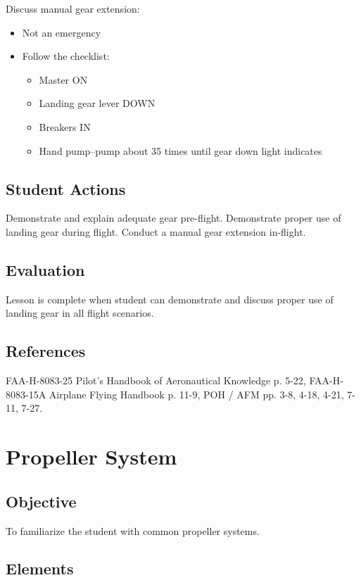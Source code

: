 \documentclass[twoside,openright]{report}
\begin{document}
Discuss manual gear extension:

\begin{itemize}
  \item Not an emergency
  \item Follow the checklist:
    \begin{itemize}
      \item Master ON
      \item Landing gear lever DOWN
      \item Breakers IN
      \item Hand pump--pump about 35 times until gear down light indicates
    \end{itemize}
\end{itemize}

\section{Student Actions}

Demonstrate and explain adequate gear pre-flight. Demonstrate proper use of
landing gear during flight. Conduct a manual gear extension in-flight.

\section{Evaluation}

Lesson is complete when student can demonstrate and discuss proper use of
landing gear in all flight scenarios.

\section{References}

FAA-H-8083-25 Pilot's Handbook of Aeronautical Knowledge p. 5-22,
FAA-H-8083-15A Airplane Flying Handbook p. 11-9, POH / AFM pp. 3-8, 4-18, 4-21,
7-11, 7-27.

\chapter{Propeller System}

\section{Objective}

To familiarize the student with common propeller systems.

\section{Elements}
\end{document}
